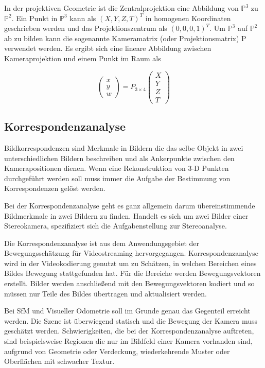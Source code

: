 In der projektiven Geometrie ist die Zentralprojektion eine Abbildung von $\mathbb{P}^3$ zu $\mathbb{P}^2$. Ein Punkt in  $\mathbb{P}^3$ kann als $(X, Y, Z, T)^T$ in homogenen Koordinaten geschrieben werden und das Projektionszentrum als $(0, 0, 0, 1)^T$. Um $\mathbb{P}^3$ auf $\mathbb{P}^2$ ab zu bilden kann die sogenannte Kameramatrix (oder Projektionsmatrix) P verwendet werden.\cite{Hartley:MVG} Es ergibt sich eine lineare Abbildung zwischen Kameraprojektion und einem Punkt im Raum als 

\begin{equation}
  \begin{pmatrix}
    x\\ y \\ w
  \end{pmatrix}
  = P_{3\times4}
  \begin{pmatrix}
    X\\Y\\Z\\T
  \end{pmatrix}
\end{equation}



\subsection{Korrespondenzanalyse}
Bildkorrespondenzen sind Merkmale in Bildern die das selbe Objekt in zwei unterschiedlichen Bildern beschreiben und als Ankerpunkte zwischen den Kamerapositionen dienen. Wenn eine Rekonstruktion von 3-D Punkten durchgeführt werden soll muss immer die Aufgabe der Bestimmung von Korrespondenzen gelöst werden.


Bei der Korrespondenzanalyse geht es ganz allgemein darum übereinstimmende Bildmerkmale in zwei Bildern zu finden. Handelt es sich um zwei Bilder einer Stereokamera, spezifiziert sich die Aufgabenstellung zur Stereoanalyse.

Die Korrespondenzanalyse ist aus dem Anwendungsgebiet der Bewegungsschätzung für Videostreaming hervorgegangen. Korrespondenzanalyse wird in der Videokodierung genutzt um zu Schätzen, in welchen Bereichen eines Bildes Bewegung stattgefunden hat. Für die Bereiche werden Bewegungsvektoren erstellt. Bilder werden anschlie{\ss}end mit den Bewegungsvektoren kodiert und so müssen nur Teile des Bildes übertragen und aktualisiert werden. \cite{stereoSchreer}  

Bei SfM und Visueller Odometrie soll im Grunde genau das Gegenteil erreicht werden. Die Szene ist überwiegend statisch und die Bewegung der Kamera muss geschätzt werden. Schwierigkeiten, die bei der Korrespondenzanalyse auftreten, sind beispielsweise Regionen die nur im Bildfeld einer Kamera vorhanden sind, aufgrund von Geometrie oder Verdeckung, wiederkehrende Muster oder Oberflächen mit schwacher Textur.
\newline

